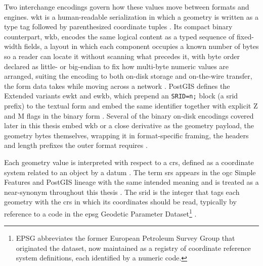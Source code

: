 Two interchange encodings govern how these values move between formats and engines. \acrfull{wkt} is a human-readable serialization in which a geometry is written as a type tag followed by parenthesized coordinate tuples \parencite{herring2011_simple_feature_access_part1}. Its compact binary counterpart, \acrfull{wkb}, encodes the same logical content as a typed sequence of fixed-width fields, a layout in which each component occupies a known number of bytes so a reader can locate it without scanning what precedes it, with byte order declared as little- or big-endian to fix how multi-byte numeric values are arranged, suiting the encoding to both on-disk storage and on-the-wire transfer, the form data takes while moving across a network \parencite{herring2011_simple_feature_access_part1}. PostGIS defines the Extended variants \acrfull{ewkt} and \acrfull{ewkb}, which prepend an \texttt{SRID=n;} block (a \acrfull{srid} prefix) to the textual form and embed the same identifier together with explicit Z and M flags in the binary form \parencite{postgis2024_manual_34, geos2021_wkb_specification}. Several of the binary on-disk encodings covered later in this thesis embed \acrshort{wkb} or a close derivative as the geometry payload, the geometry bytes themselves, wrapping it in format-specific framing, the headers and length prefixes the outer format requires \parencite{postgis2024_manual_34, ogc2024_geopackage_encoding_standard_140, ogc2024_geoparquet_specification_v110}.

Each geometry value is interpreted with respect to a \acrshort{crs}, defined as a coordinate system related to an object by a datum \parencite{herring2011_simple_feature_access_part1, lott2021_ogc_topic2_referencing_by_coordinates}. The term \acrfull{srs} appears in the \acrshort{ogc} Simple Features and PostGIS lineage with the same intended meaning and is treated as a near-synonym throughout this thesis \parencite{herring2011_simple_feature_access_part1, postgis2024_manual_34}. The \acrshort{srid} is the integer that tags each geometry with the \acrshort{crs} in which its coordinates should be read, typically by reference to a code in the \acrshort{epsg} Geodetic Parameter Dataset\footnote{EPSG abbreviates the former European Petroleum Survey Group that originated the dataset, now maintained as a registry of coordinate reference system definitions, each identified by a numeric code.} \parencite{herring2011_simple_feature_access_part1, postgis2024_manual_34, iogp2024_epsg_dataset}.

